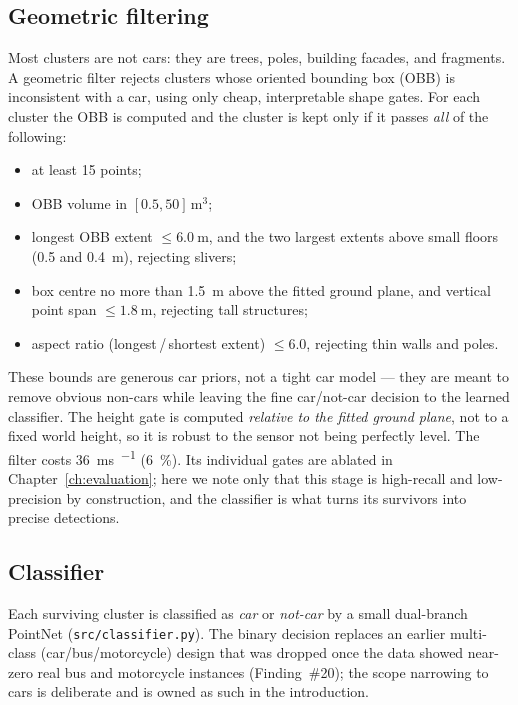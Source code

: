 \subsection{Geometric filtering}
\label{sec:pipeline-geometric}

Most clusters are not cars: they are trees, poles, building facades, and
fragments. A geometric filter rejects clusters whose oriented bounding box (OBB)
is inconsistent with a car, using only cheap, interpretable shape gates. For each
cluster the OBB is computed and the cluster is kept only if it passes \emph{all}
of the following:

\begin{itemize}
  \item at least \num{15} points;
  \item OBB volume in $[\num{0.5}, \num{50}]\,\si{\meter\cubed}$;
  \item longest OBB extent $\leq \SI{6.0}{\meter}$, and the two largest extents
    above small floors (\SI{0.5}{} and \SI{0.4}{\meter}), rejecting slivers;
  \item box centre no more than \SI{1.5}{\meter} above the fitted ground plane,
    and vertical point span $\leq \SI{1.8}{\meter}$, rejecting tall structures;
  \item aspect ratio (longest\,/\,shortest extent) $\leq \num{6.0}$, rejecting
    thin walls and poles.
\end{itemize}

These bounds are generous car priors, not a tight car model --- they are meant to
remove obvious non-cars while leaving the fine car/not-car decision to the
learned classifier. The height gate is computed \emph{relative to the fitted
ground plane}, not to a fixed world height, so it is robust to the sensor not
being perfectly level. The filter costs \SI{36}{\milli\second\per\frame}
(\SI{6}{\percent}). Its individual gates are ablated in Chapter~\ref{ch:evaluation}; here we note
only that this stage is high-recall and low-precision by construction, and the
classifier is what turns its survivors into precise detections.

\subsection{Classifier}
\label{sec:pipeline-classifier}

Each surviving cluster is classified as \emph{car} or \emph{not-car} by a small
dual-branch PointNet (\texttt{src/\allowbreak classifier.py}). The binary decision
replaces
an earlier multi-class (car/bus/motorcycle) design that was dropped once the data
showed near-zero real bus and motorcycle instances (Finding~\#20); the scope
narrowing to cars is deliberate and is owned as such in the introduction.

